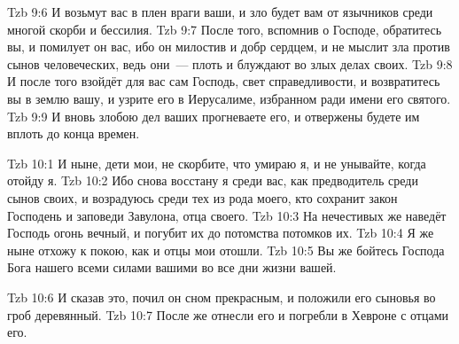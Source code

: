 \vs Tzb 9:6
И возьмут вас в плен враги ваши,
и зло будет вам от язычников среди многой скорби и бессилия.
\vs Tzb 9:7
После того, вспомнив о Господе, обратитесь вы, и помилует он вас,
ибо он милостив и добр сердцем,
и не мыслит зла против сынов человеческих,
ведь они~--- плоть и блуждают во злых делах своих.
\vs Tzb 9:8
И после того взойдёт для вас сам Господь,
свет справедливости, и возвратитесь вы в землю вашу,
и узрите его в Иерусалиме, избранном ради имени его святого.
\vs Tzb 9:9
И вновь злобою дел ваших прогневаете его,
и отвержены будете им вплоть до конца времен.

\vs Tzb 10:1
И ныне, дети мои, не скорбите, что умираю я,
и не унывайте, когда отойду я.
\vs Tzb 10:2
Ибо снова восстану я среди вас,
как предводитель среди сынов своих,
и возрадуюсь среди тех из рода моего,
кто сохранит закон Господень и заповеди Завулона, отца своего.
\vs Tzb 10:3
На нечестивых же наведёт Господь огонь вечный,
и погубит их до потомства потомков их.
\vs Tzb 10:4
Я же ныне отхожу к покою, как и отцы мои отошли.
\vs Tzb 10:5
Вы же бойтесь Господа Бога нашего всеми силами вашими во все дни жизни вашей.

\vs Tzb 10:6
И сказав это, почил он сном прекрасным,
и положили его сыновья во гроб деревянный.
\vs Tzb 10:7
После же отнесли его и погребли в Хевроне с отцами его.
